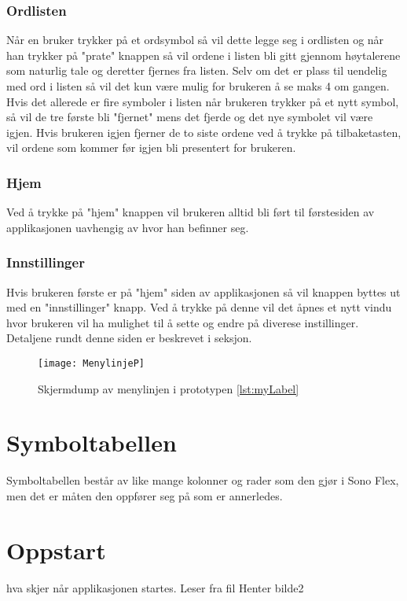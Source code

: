 \subsubsection{Ordlisten}

Når en bruker trykker på et ordsymbol så vil dette legge seg i ordlisten og når han trykker på "prate" knappen så vil ordene i listen bli gitt gjennom høytalerene som naturlig tale og deretter fjernes fra listen. Selv om det er plass til uendelig med ord i listen så vil det kun være mulig for brukeren å se maks 4 om gangen.  Hvis det allerede er fire symboler i listen når brukeren trykker på et nytt symbol, så vil de tre første bli "fjernet" mens det fjerde og det nye symbolet vil være igjen. Hvis brukeren igjen fjerner de to siste ordene ved å trykke på tilbaketasten,  vil ordene som kommer før igjen bli presentert for brukeren. 


\subsubsection{Hjem}
Ved å trykke på "hjem" knappen vil brukeren alltid bli ført til førstesiden av applikasjonen uavhengig av hvor han befinner seg. 


\subsubsection{Innstillinger}
Hvis brukeren første er på "hjem" siden av applikasjonen så vil knappen byttes ut med en "innstillinger" knapp. Ved å trykke på denne vil det åpnes et nytt vindu hvor brukeren vil ha mulighet til å sette og endre på diverese instillinger. Detaljene rundt denne siden er beskrevet i seksjon.



\begin{figure}[ht!]
\centering
\texttt{[image: MenylinjeP]}
\caption{Skjermdump av menylinjen i prototypen \ref{lst:myLabel}}
\label{fig:xamlButton}
\end{figure}


\section{Symboltabellen}

Symboltabellen består av like mange kolonner og rader som den gjør i Sono Flex,  men det er måten den oppfører seg på som er annerledes.  



\section{Oppstart}
hva skjer når applikasjonen startes.
Leser fra fil
Henter bilde2




